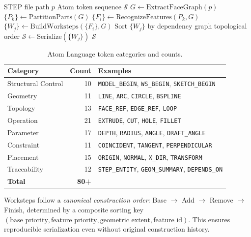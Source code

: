\documentclass{styles/svproc}
\begin{document}
\begin{algorithm}[t]
\caption{Atom Language Pipeline}
\label{alg:pipeline}
\begin{algorithmic}[1]
\REQUIRE STEP file path $p$
\ENSURE Atom token sequence $\mathcal{S}$
\STATE $G \leftarrow \text{ExtractFaceGraph}(p)$ 
\STATE $\{P_k\} \leftarrow \text{PartitionParts}(G)$ 
  \STATE $\{F_i\} \leftarrow \text{RecognizeFeatures}(P_k, G)$ 
  \STATE $\{W_j\} \leftarrow \text{BuildWorksteps}(\{F_i\}, G)$ 
  \STATE Sort $\{W_j\}$ by dependency graph topological order
\ENDFOR
\STATE $\mathcal{S} \leftarrow \text{Serialize}(\{W_j\})$ 
\RETURN $\mathcal{S}$
\end{algorithmic}
\end{algorithm}

\begin{table}[t]
\caption{Atom Language token categories and counts.}
\label{tab:tokens}
\centering
\begin{tabular}{lrl}
\toprule
Category & Count & Examples \\
\midrule
Structural Control & 10 & \texttt{MODEL\_BEGIN}, \texttt{WS\_BEGIN}, \texttt{SKETCH\_BEGIN} \\
Geometry & 11 & \texttt{LINE}, \texttt{ARC}, \texttt{CIRCLE}, \texttt{BSPLINE} \\
Topology & 13 & \texttt{FACE\_REF}, \texttt{EDGE\_REF}, \texttt{LOOP} \\
Operation & 21 & \texttt{EXTRUDE}, \texttt{CUT}, \texttt{HOLE}, \texttt{FILLET} \\
Parameter & 17 & \texttt{DEPTH}, \texttt{RADIUS}, \texttt{ANGLE}, \texttt{DRAFT\_ANGLE} \\
Constraint & 11 & \texttt{COINCIDENT}, \texttt{TANGENT}, \texttt{PERPENDICULAR} \\
Placement & 15 & \texttt{ORIGIN}, \texttt{NORMAL}, \texttt{X\_DIR}, \texttt{TRANSFORM} \\
Traceability & 12 & \texttt{STEP\_ENTITY}, \texttt{GEOM\_SUMMARY}, \texttt{DEPENDS\_ON} \\
\midrule
\textbf{Total} & \textbf{80+} & \\
\bottomrule
\end{tabular}
\end{table}

Worksteps follow a \emph{canonical construction order}: Base $\to$ Add $\to$ Remove $\to$ Finish, determined by a composite sorting key $(\text{base\_priority}, \text{feature\_priority}, \text{geometric\_extent}, \text{feature\_id})$. This ensures reproducible serialization even without original construction history.
\end{document}
